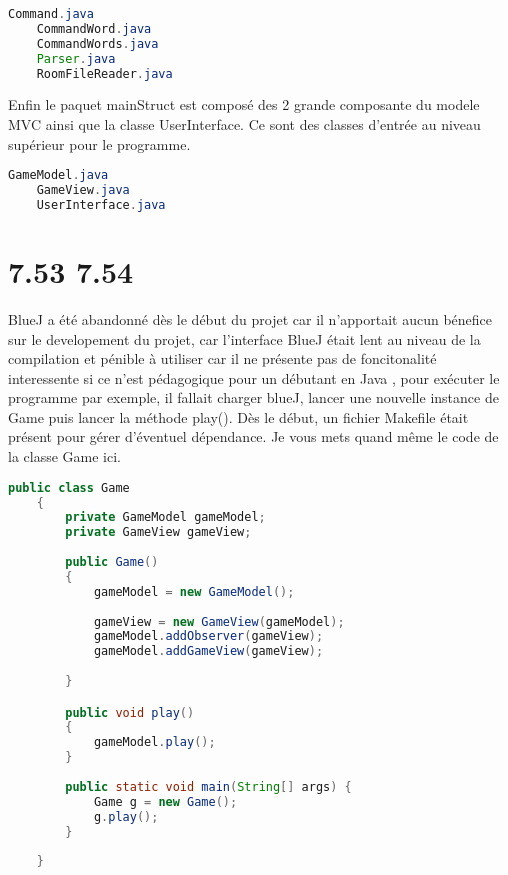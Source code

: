 \documentclass[a4paper , 10pt]{article}
\begin{document}
\begin{lstlisting}[language=Java, caption={pkg\_tools}]
    Command.java  
    CommandWord.java  
    CommandWords.java  
    Parser.java  
    RoomFileReader.java
\end{lstlisting}

Enfin le paquet mainStruct est composé des 2 grande composante du modele MVC ainsi que la classe UserInterface.
Ce sont des classes d'entrée au niveau supérieur pour le programme.
\begin{lstlisting}[language=Java, caption={pkg\_commands}]
    GameModel.java  
    GameView.java  
    UserInterface.java
\end{lstlisting}


\section{7.53 7.54}
BlueJ a été abandonné dès le début du projet car il n'apportait aucun bénefice sur le developement du projet,
 car l'interface BlueJ était lent au niveau de la compilation et pénible à utiliser car il ne présente pas de foncitonalité interessente si ce n'est pédagogique pour un débutant en Java
 , pour exécuter le programme par exemple, il fallait charger blueJ,
 lancer une nouvelle instance de Game puis lancer la méthode play(). Dès le début, un fichier Makefile était présent pour gérer d'éventuel dépendance.
Je vous mets quand même le code de la classe Game ici.

\begin{lstlisting}[language=Java, caption={pkg\_commands}]
    public class Game 
    {
        private GameModel gameModel;
        private GameView gameView;
    
        public Game() 
        {
            gameModel = new GameModel();
            
            gameView = new GameView(gameModel);
            gameModel.addObserver(gameView);
            gameModel.addGameView(gameView);
    
        }

        public void play() 
        {            
            gameModel.play();    
        }
    
        public static void main(String[] args) {
            Game g = new Game();
            g.play();
        }
    
    }
\end{lstlisting}
\end{document}
